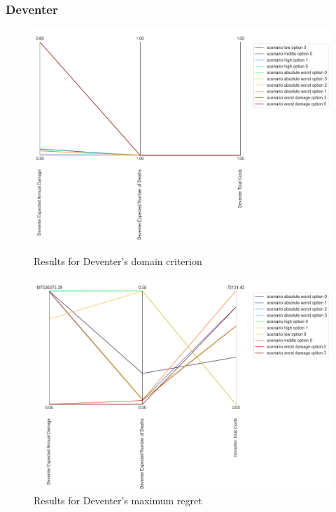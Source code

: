 \subsubsection{Deventer}

\begin{figure}[H]
  \centering
  \begin{minipage}[b]{0.4\textwidth}
    \includegraphics[width=1.15\textwidth]{report/figures/results/domain_criterion_Deventer.png}
    \caption{Results for Deventer's domain criterion}
    \label{fig:domain_criterion_Deventers}
  \end{minipage}
  \hfill
  \begin{minipage}[b]{0.4\textwidth}
    \includegraphics[width=1.15\textwidth]{report/figures/results/regret_figure_Deventer.png}
    \caption{Results for Deventer's maximum regret}
    \label{fig:regret_Deventers}
  \end{minipage}
\end{figure}

